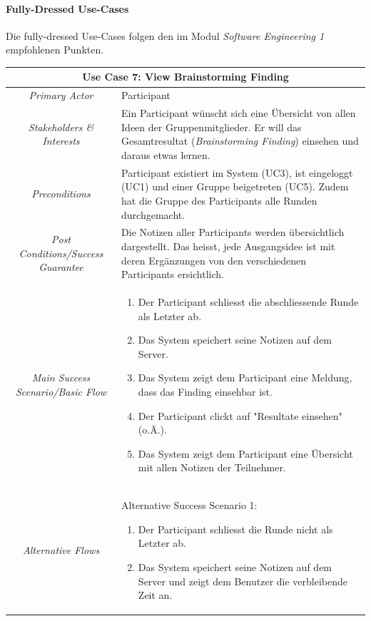 \paragraph{Fully-Dressed Use-Cases}
Die fully-dressed Use-Cases folgen den im Modul \textit{Software Engineering 1} empfohlenen Punkten.
\renewcommand{\arraystretch}{1.35}
\begin{center}
	\begin{longtable}{| c | p{7cm} |}
		\hline
		\multicolumn{2}{|c|}{\textbf{Use Case 7: View Brainstorming Finding}}\\
		\hline\hline
		\textit{Primary Actor} & Participant\\
		\hline
		\textit{Stakeholders \& Interests} & Ein Participant wünscht sich eine Übersicht von allen Ideen der Gruppenmitglieder. Er will das Gesamtresultat (\textit{Brainstorming Finding}) einsehen und daraus etwas lernen. \\
		\hline
		\textit{Preconditions} & Participant existiert im System (UC3), ist eingeloggt (UC1) und einer Gruppe beigetreten (UC5). Zudem hat die Gruppe des Participants alle Runden durchgemacht.\\
		\hline
		\textit{Post Conditions/Success Guarantee} & Die Notizen aller Participants werden übersichtlich dargestellt. Das heisst, jede Ausgangsidee ist mit deren Ergänzungen von den verschiedenen Participants ersichtlich.\\
		\hline
		\textit{Main Success Scenario/Basic Flow} & 
		\begin{enumerate}[noitemsep]
			\item Der Participant schliesst die abschliessende Runde als Letzter ab.
			\item Das System speichert seine Notizen auf dem Server.
			\item Das System zeigt dem Participant eine Meldung, dass das Finding einsehbar ist.
			\item Der Participant clickt auf "Resultate einsehen" (o.Ä.).
			\item Das System zeigt dem Participant eine Übersicht mit allen Notizen der Teilnehmer.
		\end{enumerate}\\
		\hline
		\textit{Alternative Flows} &
		Alternative	Success Scenario 1:
		\begin{enumerate}[label=1.\alph*,noitemsep]
			\item Der Participant schliesst die Runde nicht als Letzter ab.
			\item Das System speichert seine Notizen auf dem Server und zeigt dem Benutzer die verbleibende Zeit an.

\end{enumerate}
\end{longtable}
\end{center}
